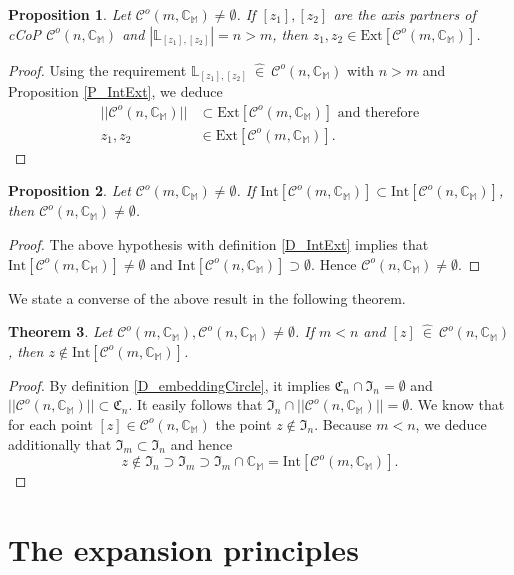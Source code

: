 \documentclass[12pt]{amsart}
\newtheorem{theorem}{Theorem}[section]
\newtheorem{proposition}[theorem]{Proposition}
\theoremstyle{definition}
\theoremstyle{remark}
\numberwithin{equation}{section}
\newcommand{\inn}{~ \hat{\in}~ }
\newcommand{\C}{\mathcal{C}}
\newcommand{\CC}{\mathbb{C}}
\newcommand{\CV}{\mathfrak{C}}
\newcommand{\M}{\mathbb{M}}
\newcommand{\I}{\mathfrak{I}}
\newcommand{\LL}{\mathbb{L}}
\newcommand{\In}[1]{\mathrm{Int}[#1]}
\newcommand{\Ex}[1]{\mathrm{Ext}[#1]}
\begin{document}
\begin{proposition}
Let $\C^{o}(m,\CC_{\M})\neq \emptyset$. If $[z_1],[z_2]$ are the axis partners of cCoP $\C^{o}(n,\CC_{\M})$ and $|\LL_{[z_1],[z_2]}|=n>m$, then $z_1,z_2\in \mathrm{Ext}[\C^{o}(m,\CC_{\M})]$. 
\end{proposition}

\begin{proof}
Using the requirement $\LL_{[z_1],[z_2]}\inn\C^o(n,\CC_{\M})$ with $n>m$ and Proposition \ref{P_IntExt}, we deduce
\begin{align*}
||\C^o(n,\CC_{\M})||&\subset\Ex{\C^o(m,\CC_{\M})}
\mbox{ and therefore}\\
z_1,z_2&\in\Ex{\C^o(m,\CC_{\M})}.
\end{align*}
\end{proof}

\begin{proposition}
Let $\C^{o}(m,\CC_{\M})\neq \emptyset$. If $\mathrm{Int}[\C^{o}(m,\CC_{\M})]\subset \mathrm{Int}[\C^{o}(n,\CC_{\M})]$, then $\C^{o}(n,\CC_{\M})\neq \emptyset$.
\end{proposition}

\begin{proof}
The above hypothesis with definition \ref{D_IntExt} implies that $\In{\C^o(m,\CC_{\M})}\neq\emptyset$ and $\In{\C^o(n,\CC_{\M})}\supset\emptyset$. Hence $\C^o(n,\CC_{\M})\neq\emptyset$.
\end{proof}

We state a converse of the above result in the following theorem.

\begin{theorem}
Let $\C^{o}(m,\CC_{\M}),\C^{o}(n,\CC_{\M})\neq \emptyset$. If $m<n$ and $[z]\inn \C^{o}(n,\CC_{\M})$, then  $z\not \in \In{\C^o(m,\CC_{\M})}$.
\end{theorem}

\begin{proof}
By definition \ref{D_embeddingCircle}, it implies $\CV_n\cap\I_n=\emptyset$ and $||\C^o(n,\CC_{\M})||\subset\CV_n$. It easily follows that $\I_n\cap||\C^o(n,\CC_{\M})||=\emptyset$. We know that for each point $[z]\in\C^o(n,\CC_{\M})$ the point  $z\not\in\I_n$. Because $m<n$, we deduce additionally that $\I_m\subset\I_n$ and hence 
\[
z\not\in\I_n\supset\I_m\supset\I_m\cap\CC_{\M}=\In{\C^o(m,\CC_{\M})}.
\]
\end{proof}

\section{The expansion principles}
\end{document}
